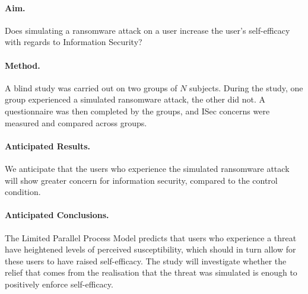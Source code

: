 \documentclass[letterpaper,twocolumn,10pt]{article}
\begin{document}
\paragraph{Aim.} 
Does simulating a ransomware attack on a user increase the user's self-efficacy with regards to Information Security?

\paragraph{Method.}

A blind study was carried out on two groups of 
$N$ subjects. During the study, one group experienced a simulated ransomware attack, the other did not. A questionnaire was then completed by the groups, and ISec concerns were measured and compared across groups.


\paragraph{Anticipated Results.}
We anticipate that the users who experience the simulated ransomware attack will show greater concern for information security, compared to the control condition. 

\paragraph{Anticipated Conclusions.}
The Limited Parallel Process Model predicts that users who experience a threat have heightened levels of perceived susceptibility, which should in turn allow for these users to have raised self-efficacy. The study will investigate whether the relief that comes from the realisation that the threat was simulated is enough to positively enforce self-efficacy.

\end{document}
